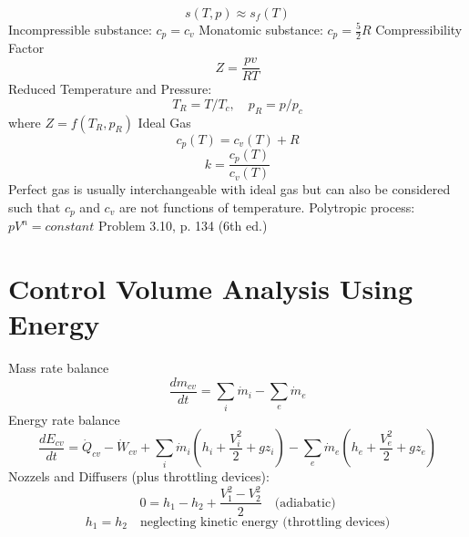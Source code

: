 \documentclass[paper=letter, fontsize=11pt]{scrartcl}
\numberwithin{equation}{section}        %
\numberwithin{figure}{section}          %
\numberwithin{table}{section}               %
\begin{document}
\begin{equation}
    s(T,p)\approx s_f(T)
\end{equation}
\newline
\newline
Incompressible substance: $c_p=c_v$
\newline
\newline
Monatomic substance: $c_p=\frac{5}{2}R$
\newline
\newline
Compressibility Factor
\begin{equation}
    Z = \frac{pv}{RT}
\end{equation}
\newline
\newline
Reduced Temperature and Pressure:
\begin{equation}
    T_R = T/T_c,\quad p_R = p/p_c
\end{equation}
where $Z=f(T_R,p_R)$
\newline
\newline
Ideal Gas
\begin{equation}
    c_p(T) = c_v(T)+R
\end{equation}
\begin{equation}
    k = \frac{c_p(T)}{c_v(T)}
\end{equation}
\newline
\newline
Perfect gas is usually interchangeable with ideal gas but can also be considered such that $c_p$ and $c_v$ are not functions of temperature.
\newline
\newline
Polytropic process: $pV^n=constant$
\newline
\newline
Problem 3.10, p. 134 (6th ed.)


\newpage
\section{Control Volume Analysis Using Energy}

Mass rate balance
\begin{equation}
    \frac{dm_{cv}}{dt} = \sum_i \dot m_i - \sum_e \dot m_e
\end{equation}
\newline
\newline
Energy rate balance
\begin{equation}
    \frac{dE_{cv}}{dt} = \dot Q_{cv} -  \dot W_{cv} + \sum_i \dot m_i \left(h_i + \frac{V_i^2}{2} + gz_i \right) - \sum_e \dot m_e \left(h_e + \frac{V_e^2}{2} + gz_e \right) 
\end{equation}
\newline
\newline
Nozzels and Diffusers (plus throttling devices):
\begin{equation}
    0 = h_1 - h_2 + \frac{V_1^2 - V_2^2}{2}\quad\text{(adiabatic)}
\end{equation}
\begin{equation}
    h_1 = h_2\quad\text{neglecting kinetic energy (throttling devices)}
\end{equation}
\end{document}
